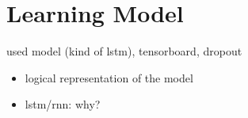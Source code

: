 \section{Learning Model}
\label{sec:model}
used model (kind of lstm), tensorboard, dropout
\begin{itemize}
	\item logical representation of the model
	\item lstm/rnn: why?
\end{itemize}